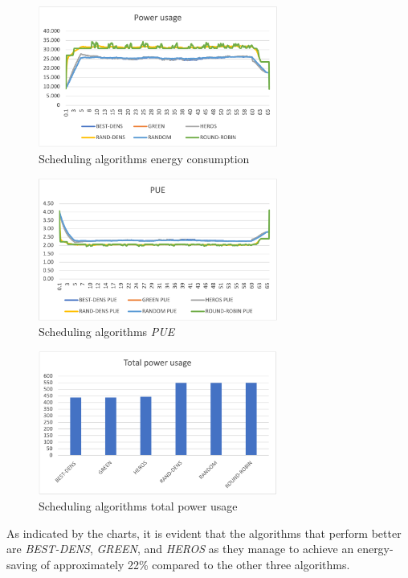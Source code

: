 \begin{figure}[h]
    \centering
    \includegraphics[width=0.7\textwidth]{chapters/images/schedulers_energyconsumption.png}
    \caption{Scheduling algorithms energy consumption}
    \label{fig:schedulers_energyconsumption}
\end{figure}

\begin{figure}[h]
    \centering
    \includegraphics[width=0.7\textwidth]{chapters/images/schedulers_pue.png}
    \caption{Scheduling algorithms \emph{PUE}}
    \label{fig:schedulers_pue}
\end{figure}

\begin{figure}[h]
    \centering
    \includegraphics[width=0.7\textwidth]{chapters/images/schedulers_totalconsumption.png}
    \caption{Scheduling algorithms total power usage}
    \label{fig:schedulers_totalconsumption}
\end{figure}
As indicated by the charts, it is evident that the algorithms that perform better are \emph{BEST-DENS}, \emph{GREEN}, and \emph{HEROS} as they manage to achieve an energy-saving of approximately 22\% compared to the other three algorithms.


